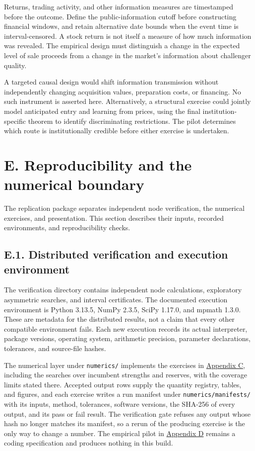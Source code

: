 \documentclass[
  11pt,
]{article}
\begin{document}
Returns, trading activity, and other information measures are
timestamped before the outcome. Define the public-information cutoff
before constructing financial windows, and retain alternative date
bounds when the event time is interval-censored. A stock return is not
itself a measure of how much information was revealed. The empirical
design must distinguish a change in the expected level of sale proceeds
from a change in the market's information about challenger quality.

A targeted causal design would shift information transmission without
independently changing acquisition values, preparation costs, or
financing. No such instrument is asserted here. Alternatively, a
structural exercise could jointly model anticipated entry and learning
from prices, using the final institution-specific theorem to identify
discriminating restrictions. The pilot determines which route is
institutionally credible before either exercise is undertaken.

\section{E. Reproducibility and the numerical boundary}\label{oa-e}

The replication package separates independent node verification, the
numerical exercises, and presentation. This section describes their
inputs, recorded environments, and reproducibility checks.

\subsection{E.1. Distributed verification and execution
environment}\label{oa-e-environment}

The verification directory contains independent node calculations,
exploratory asymmetric searches, and interval certificates. The
documented execution environment is Python 3.13.5, NumPy 2.3.5, SciPy
1.17.0, and mpmath 1.3.0. These are metadata for the distributed
results, not a claim that every other compatible environment fails. Each
new execution records its actual interpreter, package versions,
operating system, arithmetic precision, parameter declarations,
tolerances, and source-file hashes.

The numerical layer under \texttt{numerics/} implements the exercises in
\hyperref[oa-c]{Appendix C}, including the searches over incumbent
strengths and reserves, with the coverage limits stated there. Accepted
output rows supply the quantity registry, tables, and figures, and each
exercise writes a run manifest under \texttt{numerics/manifests/} with
its inputs, method, tolerances, software versions, the SHA-256 of every
output, and its pass or fail result. The verification gate refuses any
output whose hash no longer matches its manifest, so a rerun of the
producing exercise is the only way to change a number. The empirical
pilot in \hyperref[oa-d]{Appendix D} remains a coding specification and
produces nothing in this build.
\end{document}
